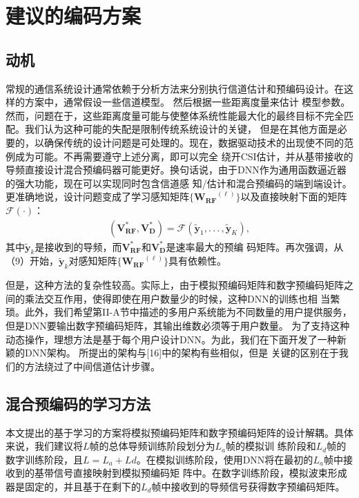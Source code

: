 \documentclass[10pt,journal,final]{IEEEtran}%
\begin{document}
\section{建议的编码方案}
\vspace{-0.3em}
\subsection{动机} 
\vspace{0.2em}
常规的通信系统设计通常依赖于分析方法来分别执行信道估计和预编码设计。在这样的方案中，通常假设一些信道模型。 然后根据一些距离度量来估计
模型参数。 然而，问题在于，这些距离度量可能与使整体系统性能最大化的最终目标不完全匹配。我们认为这种可能的失配是限制传统系统设计的关键，
但是在其他方面是必要的，以确保传统的设计问题是可处理的。现在，数据驱动技术的出现使不同的范例成为可能。不再需要遵守上述分离，即可以完全
绕开CSI估计，并从基带接收的导频直接设计混合预编码器可能更好。换句话说，由于DNN作为通用函数逼近器的强大功能，现在可以实现同时包含信道感
知/估计和混合预编码的端到端设计。更准确地说，设计问题变成了学习感知矩阵$\{\mathbf{W_{RF}}^{(\ell)}\}$以及直接映射下面的矩阵$\mathcal{F} (\cdot )$：
\begin{align}
(\mathbf{V}_{\mathbf{RF}}^{\ast},\mathbf{V}_{\mathbf{D}}^{\ast})=\mathcal{F}(\tilde{\mathbf{y}}_{1},.\,.\,.\, ,\tilde{\mathbf{y}}_{K}),
\end{align}
其中$\tilde{\mathbf{y}}_{k}$是接收到的导频，而$\mathbf{V}_{\mathbf{RF}}^{\ast}$和$\mathbf{V}_{\mathbf{D}}^{\ast}$是速率最大的预编
码矩阵。再次强调，从（9）开始，$\tilde{\mathbf{y}}_{k}$对感知矩阵$\{\mathbf{W_{RF}}^{(\ell)}\}$具有依赖性。

但是，这种方法的复杂性较高。实际上，由于模拟预编码矩阵和数字预编码矩阵之间的乘法交互作用，使得即使在用户数量少的时候，这种DNN的训练也相
当繁琐。此外，我们希望第II-A节中描述的多用户系统能为不同数量的用户提供服务，但是DNN要输出数字预编码矩阵，其输出维数必须等于用户数量。
为了支持这种动态操作，理想方法是基于每个用户设计DNN。为此，我们在下面开发了一种新颖的DNN架构。 所提出的架构与[16]中的架构有些相似，但是
关键的区别在于我们的方法绕过了中间信道估计步骤。
\vspace{-1.8em}
\subsection{混合预编码的学习方法}
\vspace{0.2em}
本文提出的基于学习的方案将模拟预编码矩阵和数字预编码矩阵的设计解耦。具体来说，我们建议将$L$帧的总体导频训练阶段划分为$L_{a}$帧的模拟训
练阶段和$L_{d}$帧的数字训练阶段，且$L=L_{a}+L{d}$。在模拟训练阶段，使用DNN将在最初的$L_{a}$帧中接收到的基带信号直接映射到模拟预编码矩
阵中。在数字训练阶段，模拟波束形成器是固定的，并且基于在剩下的$L_{d}$帧中接收到的导频信号获得数字预编码矩阵。
\end{document}
